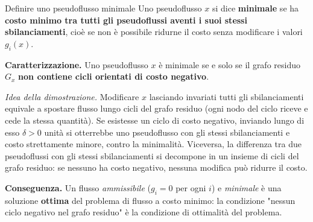 \documentclass[12pt]{extarticle} %
\begin{document}
\begin{teoriabox}{Definire uno pseudoflusso minimale}
Uno pseudoflusso $x$ si dice \textbf{minimale} se ha \textbf{costo minimo tra tutti gli pseudoflussi aventi i suoi stessi sbilanciamenti}, cioè se non è possibile ridurne il costo senza modificare i valori $g_i(x)$.

\noindent\textbf{Caratterizzazione.} Uno pseudoflusso $x$ è minimale se e solo se il grafo residuo $G_x$ \textbf{non contiene cicli orientati di costo negativo}.

\noindent\textit{Idea della dimostrazione.} Modificare $x$ lasciando invariati tutti gli sbilanciamenti equivale a spostare flusso lungo cicli del grafo residuo (ogni nodo del ciclo riceve e cede la stessa quantità). Se esistesse un ciclo di costo negativo, inviando lungo di esso $\delta > 0$ unità si otterrebbe uno pseudoflusso con gli stessi sbilanciamenti e costo strettamente minore, contro la minimalità. Viceversa, la differenza tra due pseudoflussi con gli stessi sbilanciamenti si decompone in un insieme di cicli del grafo residuo: se nessuno ha costo negativo, nessuna modifica può ridurre il costo.

\noindent\textbf{Conseguenza.} Un flusso \textit{ammissibile} ($g_i = 0$ per ogni $i$) e \textit{minimale} è una soluzione \textbf{ottima} del problema di flusso a costo minimo: la condizione "nessun ciclo negativo nel grafo residuo" è la condizione di ottimalità del problema.
\end{teoriabox}
\end{document}
